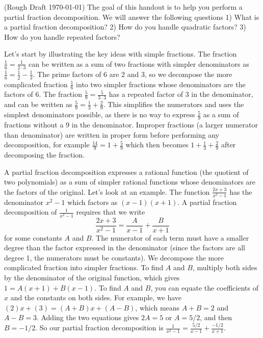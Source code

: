 \documentclass[10pt]{article}
\begin{document}

\noindent(Rough Draft \today)
The goal of this handout is to help you perform a partial fraction decomposition.
We will answer the following questions 1) What is a partial fraction decomposition? 2) How do you handle quadratic factors? 3) How do you handle repeated factors?

Let's start by illustrating the key ideas with simple fractions. The fraction $\frac{1}{6} = \frac{1}{2\cdot 3}$ can be written as a sum of two fractions with simpler denominators as $\frac16=\frac12-\frac13$. The prime factors of 6 are 2 and 3, so we decompose the more complicated fraction $\frac16$ into two simpler fractions whose denominators are the factors of 6. The fraction $\frac{5}{9} = \frac{5}{3\cdot 3}$ has a repeated factor of $3$ in the denominator, and can be written as $\frac{5}{9} = \frac{1}{3}+\frac{2}{9}$. This simplifies the numerators and uses the simplest denominators possible, as there is no way to express $\frac 59$ as a sum of fractions without a 9 in the denominator. Improper fractions (a larger numerator than denominator) are written in proper form before performing any decomposition, for example $\frac{14}{9}=1+\frac59$ which then becomes $1+\frac13+\frac29$ after decomposing the fraction.

A partial fraction decomposition expresses a rational function (the quotient of two polynomials) as a sum of simpler rational functions whose denominators are the factors of the original. Let's look at an example. The function $\frac{2x+3}{x^2-1}$ has the denominator $x^2-1$ which factors as $(x-1)(x+1)$. A partial fraction decomposition of $\frac{1}{x^2-1}$ requires that we write 
$$\frac{2x+3}{x^2-1}=\frac{A}{x-1}+\frac{B}{x+1}$$ 
for some constants $A$ and $B$. The numerator of each term must have a smaller degree than the factor expressed in the denominator (since the factors are all degree 1, the numerators must be constants). We decompose the more complicated fraction into simpler fractions. To find $A$ and $B$, multiply both sides by the denominator of the original function, which gives 
$1=A(x+1)+B(x-1).$ 
To find $A$ and $B$, you can equate the coefficients of $x$ and the constants on both sides. For example, we have $(2)x+(3) = (A+B)x+(A-B)$, which means $A+B=2$ and $A-B=3$.  Adding the two equations gives $2A=5$ or $A=5/2$, and then $B=-1/2$.  So our partial fraction decomposition is $\frac{1}{x^2-1}=\frac{5/2}{x-1}+\frac{-1/2}{x+1}.$
\end{document}
